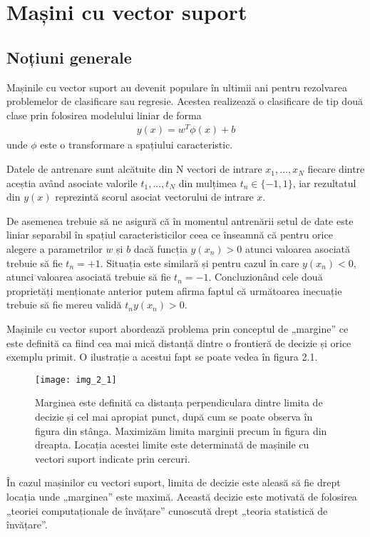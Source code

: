 \section{Mașini cu vector suport}

\subsection{Noțiuni generale}

Mașinile cu vector suport au devenit populare în ultimii ani pentru rezolvarea problemelor de clasificare sau regresie. Acestea realizează o clasificare de tip două clase prin folosirea modelului liniar de forma
\begin{align}
	y(x) = w^T\phi(x) + b
\end{align}
unde $\phi$ este o transformare a spațiului caracteristic.

Datele de antrenare sunt alcătuite din N vectori de intrare $x_1, ...,x_N$ fiecare dintre aceștia având asociate valorile $t_1, ...,t_N$ din mulțimea $t_n \in \{-1,1\}$, iar rezultatul din $y(x)$ reprezintă scorul asociat vectorului de intrare $x$.

De asemenea trebuie să ne asigură că în momentul antrenării setul de date este liniar separabil în spațiul caracteristicilor ceea ce înseamnă că pentru orice alegere a parametrilor $w$ și $b$ dacă funcția $y(x_n) > 0$ atunci valoarea asociată trebuie să fie $t_n = +1$. Situația este similară și pentru cazul în care $y(x_n ) < 0$, atunci valoarea asociată trebuie să fie $t_n = -1$. 
Concluzionând cele două proprietăți menționate anterior putem afirma faptul că următoarea inecuație trebuie să fie mereu validă  $t_n y(x_n) > 0$. 

Mașinile cu vector suport abordează problema prin conceptul de „margine” ce este definită ca fiind cea mai mică distanță dintre o frontieră de decizie și orice exemplu primit. O ilustrație a acestui fapt se poate vedea în figura 2.1.
\begin{figure}[!h]
	\centering
	\texttt{[image: img\_2\_1]}
	\caption[Mașini cu vector suport]{Marginea este definită ca distanța perpendiculara dintre limita de decizie și cel mai apropiat punct, după cum se poate observa în figura din stânga. Maximizăm limita marginii precum în figura din dreapta. Locația acestei limite este determinată de mașinile cu vectori suport indicate prin cercuri.}
\end{figure} 

În cazul mașinilor cu vectori suport, limita de decizie este aleasă să fie drept locația unde „marginea” este maximă. Această decizie este motivată de folosirea „teoriei computaționale de învățare” cunoscută drept „teoria statistică de învățare”. 

